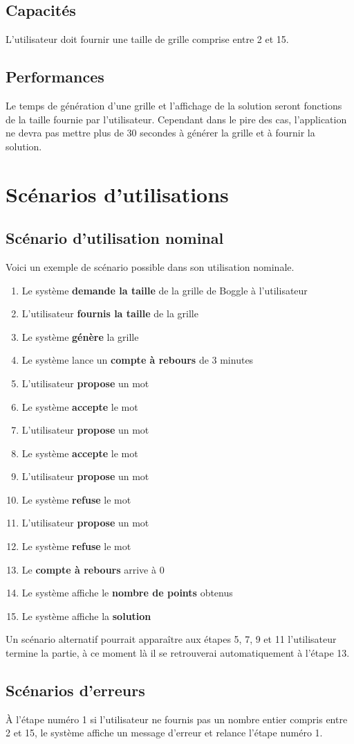 \documentclass[12pt,a4paper,openany]{article}
\begin{document}
	\subsection{Capacités}
	L'utilisateur doit fournir une taille de grille comprise entre 2 et 15.
	\subsection{Performances}
	Le temps de génération d'une grille et l'affichage de la solution seront fonctions de la taille fournie par l'utilisateur. Cependant dans le pire
	des cas, l'application ne devra pas mettre plus de 30 secondes à générer la grille et à fournir la solution.

	\section{Scénarios d'utilisations}
	\subsection{Scénario d'utilisation nominal}
	Voici un exemple de scénario possible dans son utilisation nominale.
		\begin{enumerate}
			\item Le système \textbf{demande la taille} de la grille de Boggle à l'utilisateur
			\item L'utilisateur \textbf{fournis la taille} de la grille 
			\item Le système \textbf{génère} la grille
			\item Le système lance un \textbf{compte à rebours} de 3 minutes
			\item L'utilisateur \textbf{propose} un mot
			\item Le système \textbf{accepte} le mot
			\item L'utilisateur \textbf{propose} un mot
			\item Le système \textbf{accepte} le mot
			\item L'utilisateur \textbf{propose} un mot
			\item Le système \textbf{refuse }le mot
			\item L'utilisateur \textbf{propose} un mot
			\item Le système \textbf{refuse} le mot
			\item Le \textbf{compte à rebours} arrive à 0
			\item Le système affiche le \textbf{nombre de points} obtenus
			\item Le système affiche la \textbf{solution}
		\end{enumerate}

		Un scénario alternatif pourrait apparaître aux étapes 5, 7, 9 et 11 l'utilisateur termine la partie, à ce moment là il se retrouverai automatiquement à
		l'étape 13.
	\subsection{Scénarios d'erreurs}
		À l'étape numéro 1 si l'utilisateur ne fournis pas un nombre entier compris entre 2 et 15, le système affiche un message d'erreur
			et relance l'étape numéro 1.
	
\end{document}
